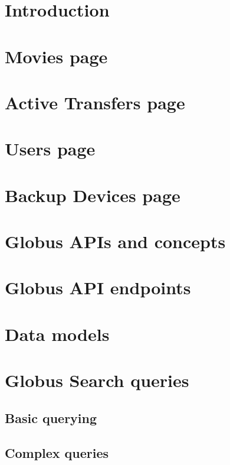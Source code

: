 \documentclass{report}
\begin{document}
\maketitle
\tableofcontents

\chapter{Introduction}


\chapter{Movies page}


\chapter{Active Transfers page}


\chapter{Users page}


\chapter{Backup Devices page}


\appendix

\chapter{Globus APIs and concepts}


\chapter{Globus API endpoints\label{appendix:globusapis}}


\chapter{Data models}


\chapter{Globus Search queries}
\section{Basic querying}
\section{Complex queries}
\end{document}
